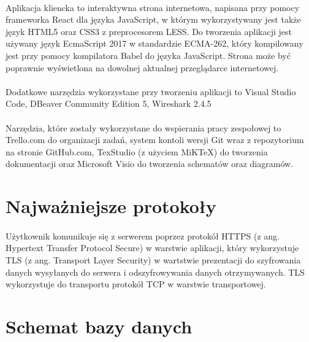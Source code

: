 \documentclass{article}
\begin{document}
	\paragraph*{} Aplikacja kliencka to interaktywna strona internetowa, napisana przy pomocy frameworka React dla języka JavaScript, w którym wykorzystywany jest także język HTML5 oraz CSS3 z preprocesorem LESS. Do tworzenia aplikacji jest używany język EcmaScript 2017 w standardzie ECMA-262, który kompilowany jest przy pomocy kompilatora Babel do języka JavaScript. Strona może być poprawnie wyświetlona na dowolnej aktualnej przeglądarce internetowej.
	\paragraph*{} Dodatkowe narzędzia wykorzystane przy tworzeniu aplikacji to Visual Studio Code, DBeaver Community Edition 5, Wireshark 2.4.5
	\paragraph*{} Narzędzia, które zostały wykorzystane do wspierania pracy zespołowej to Trello.com do organizacji zadań, system kontoli wersji Git wraz z repozytorium na stronie GitHub.com, TexStudio (z użyciem MiKTeX) do tworzenia dokumentacji oraz Microsoft Visio do tworzenia schematów oraz diagramów.
	\section{Najważniejsze protokoły}
	\paragraph*{}
	Użytkownik komunikuje się z serwerem poprzez protokół HTTPS (z ang. Hypertext Transfer Protocol Secure) w warstwie aplikacji, który wykorzystuje TLS (z ang. Transport Layer Security) w wartstwie prezentacji do szyfrowania danych wysyłanych do serwera i odszyfrowywania danych otrzymywanych. TLS wykorzystuje do transportu protokół TCP w warstwie transportowej.
	\section{Schemat bazy danych}
\end{document}
